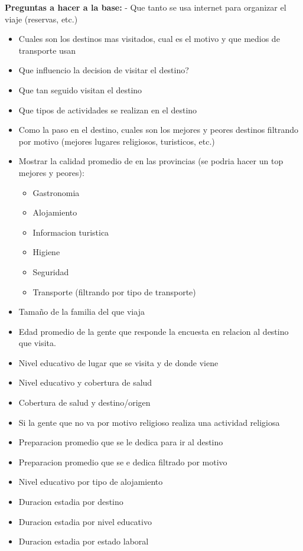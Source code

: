 \documentclass[
]{article}
\begin{document}
\textbf{Preguntas a hacer a la base: } - Que tanto se usa internet para
organizar el viaje (reservas, etc.)

\begin{itemize}
\item
  Cuales son los destinos mas visitados, cual es el motivo y que medios
  de transporte usan
\item
  Que influencio la decision de visitar el destino?
\item
  Que tan seguido visitan el destino
\item
  Que tipos de actividades se realizan en el destino
\item
  Como la paso en el destino, cuales son los mejores y peores destinos
  filtrando por motivo (mejores lugares religiosos, turisticos, etc.)
\item
  Mostrar la calidad promedio de en las provincias (se podria hacer un
  top mejores y peores):

  \begin{itemize}
  \item
    Gastronomia
  \item
    Alojamiento
  \item
    Informacion turistica
  \item
    Higiene
  \item
    Seguridad
  \item
    Transporte (filtrando por tipo de transporte)
  \end{itemize}
\item
  Tamaño de la familia del que viaja
\item
  Edad promedio de la gente que responde la encuesta en relacion al
  destino que visita.
\item
  Nivel educativo de lugar que se visita y de donde viene
\item
  Nivel educativo y cobertura de salud
\item
  Cobertura de salud y destino/origen
\item
  Si la gente que no va por motivo religioso realiza una actividad
  religiosa
\item
  Preparacion promedio que se le dedica para ir al destino
\item
  Preparacion promedio que se e dedica filtrado por motivo
\item
  Nivel educativo por tipo de alojamiento
\item
  Duracion estadia por destino
\item
  Duracion estadia por nivel educativo
\item
  Duracion estadia por estado laboral
\end{itemize}
\end{document}
